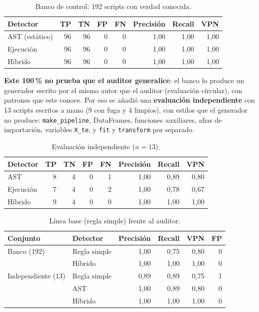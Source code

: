 \begin{table}[H]
\centering
\caption{Banco de control: 192 scripts con verdad conocida.}
\label{tab:banco}
\begingroup\footnotesize\singlespacing
\begin{tabular}{@{}l r r r r r r r@{}}
\toprule
Detector & TP & TN & FP & FN & Precisión & Recall & VPN \\
\midrule
AST (estático) & 96 & 96 & 0 & 0 & 1,00 & 1,00 & 1,00 \\
Ejecución & 96 & 96 & 0 & 0 & 1,00 & 1,00 & 1,00 \\
Híbrido & 96 & 96 & 0 & 0 & 1,00 & 1,00 & 1,00 \\
\bottomrule
\end{tabular}
\endgroup
\end{table}

\textbf{Este 100\,\% no prueba que el auditor generalice}: el banco lo produce un generador escrito por el mismo autor que el auditor (evaluación circular), con patrones que este conoce. Por eso se añadió una \textbf{evaluación independiente} con 13 scripts escritos a mano (9 con fuga y 4 limpios), con estilos que el generador no produce: \texttt{make\_pipeline}, DataFrames, funciones auxiliares, alias de importación, variables \texttt{X\_te}, y \texttt{fit} y \texttt{transform} por separado.

\begin{table}[H]
\centering
\caption{Evaluación independiente ($n=13$).}
\label{tab:indep}
\begingroup\footnotesize\singlespacing
\begin{tabular}{@{}l r r r r r r r@{}}
\toprule
Detector & TP & TN & FP & FN & Precisión & Recall & VPN \\
\midrule
AST & 8 & 4 & 0 & 1 & 1,00 & 0,89 & 0,80 \\
Ejecución & 7 & 4 & 0 & 2 & 1,00 & 0,78 & 0,67 \\
Híbrido & 9 & 4 & 0 & 0 & 1,00 & 1,00 & 1,00 \\
\bottomrule
\end{tabular}
\endgroup
\end{table}

\begin{table}[H]
\centering
\caption{Línea base (regla simple) frente al auditor.}
\label{tab:base}
\begingroup\footnotesize\singlespacing
\begin{tabular}{@{}l l r r r r@{}}
\toprule
Conjunto & Detector & Precisión & Recall & VPN & FP \\
\midrule
Banco (192) & Regla simple & 1,00 & 0,75 & 0,80 & 0 \\
 & Híbrido & 1,00 & 1,00 & 1,00 & 0 \\
Independiente (13) & Regla simple & 0,89 & 0,89 & 0,75 & 1 \\
 & AST & 1,00 & 0,89 & 0,80 & 0 \\
 & Híbrido & 1,00 & 1,00 & 1,00 & 0 \\
\bottomrule
\end{tabular}
\endgroup
\end{table}

